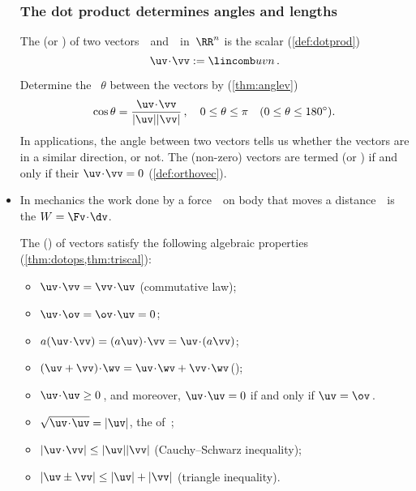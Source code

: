 \begin{itemize}
\subsubsection{The dot product determines angles and lengths}

\itemhi The  (or ) of two vectors~\uv\ and~\vv\ in~\(\RR^n\) is the scalar (\cref{def:dotprod})
\begin{equation*}
\uv\cdot \vv:= \lincomb uvn\,.
\end{equation*}
\begin{itemize}
\itemhi  Determine the ~\(\theta\) between the vectors by (\cref{thm:anglev})
\begin{equation*}
\cos\theta=\frac{\uv\cdot\vv}{|\uv||\vv|}\,,
\quad 0\leq\theta\leq\pi
\quad (0\leq\theta\leq180^\circ).
\end{equation*}
In applications, the angle between two vectors tells us whether the vectors are in a similar direction, or not.
\itemhi The (non-zero) vectors are termed  (or ) if and only if their  \(\uv\cdot\vv=0\) (\cref{def:orthovec}).
\end{itemize}

\item In mechanics the work done by a force~\Fv\ on body that moves a distance~\dv\ is the  \(W=\Fv\cdot\dv\).

\itemme The  () of vectors 
satisfy the following algebraic properties (\cref{thm:dotops,thm:triscal}):
\begin{itemize}
\item \(\uv\cdot\vv=\vv\cdot\uv\) \quad({commutative law});
\item \(\uv\cdot\ov=\ov\cdot\uv=0\);
\item \(a(\uv\cdot\vv)=(a\uv)\cdot\vv=\uv\cdot(a\vv)\);
\item \((\uv+\vv)\cdot\wv=\uv\cdot\wv+\vv\cdot\wv\)\quad();
\item \(\uv\cdot\uv\geq0\)\,, and moreover, \(\uv\cdot\uv=0\) if and only if \(\uv=\ov\)\,.
\item \(\sqrt{\uv\cdot\uv}=|\uv|\), the  of~\uv;
\item \(|\uv\cdot\vv|\leq|\uv||\vv|\) ({Cauchy--Schwarz inequality});
\item \(|\uv\pm\vv|\leq|\uv|+|\vv|\) ({triangle inequality}).
\end{itemize}


\end{itemize}
